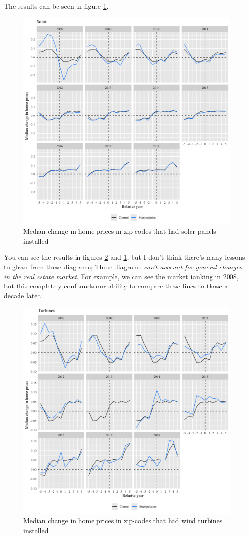\documentclass{article}
\begin{document}
The results can be seen in figure \ref{study1solarfacets}.
\begin{figure}[h]
\centering
\includegraphics[width=0.9\linewidth]
{study1_solar_facets.png} 
\caption{Median change in home prices in zip-codes that had solar panels installed}
\label{study1solarfacets}
\end{figure}

You can see the results in figures \ref{study1turbinefacets} and \ref{study1solarfacets}, but I don't think there's many lessons to glean from these diagrams;
These diagrams \emph{can't account for general changes in the real estate market.}
For example, we can see the market tanking in 2008, but this completely confounds our ability to compare these lines to those a decade later.
\begin{figure}[h]
\centering
\includegraphics[width=0.9\linewidth]
{study1_turbine_facets.png} 
\caption{Median change in home prices in zip-codes that had wind turbines installed}
\label{study1turbinefacets}
\end{figure}
\end{document}
